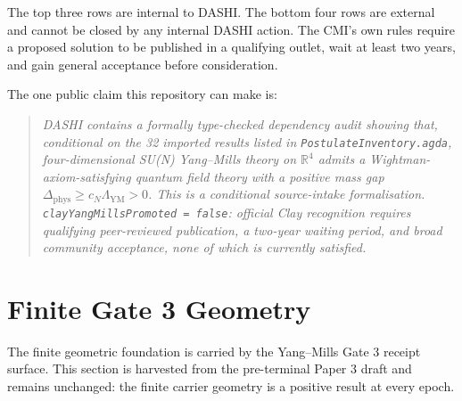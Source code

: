\documentclass[11pt,a4paper]{article}
\begin{document}
The top three rows are internal to DASHI.  The bottom four rows are external
and cannot be closed by any internal DASHI action.  The CMI's own rules
\cite{clayrules} require a proposed solution to be published in a qualifying
outlet, wait at least two years, and gain general acceptance before
consideration.

The one public claim this repository can make is:

\begin{quote}
\emph{DASHI contains a formally type-checked dependency audit showing that,
conditional on the 32 imported results listed in
\texttt{PostulateInventory.agda}, four-dimensional SU(N) Yang--Mills theory on
$\mathbb{R}^4$ admits a Wightman-axiom-satisfying quantum field theory with a
positive mass gap $\Delta_{\mathrm{phys}} \geq c_N \Lambda_{\mathrm{YM}} > 0$.
This is a conditional source-intake formalisation.
\texttt{clayYangMillsPromoted = false}: official Clay recognition requires
qualifying peer-reviewed publication, a two-year waiting period, and broad
community acceptance, none of which is currently satisfied.}
\end{quote}

\section{Finite Gate 3 Geometry}

The finite geometric foundation is carried by the Yang--Mills Gate 3 receipt
surface.  This section is harvested from the pre-terminal Paper 3 draft and
remains unchanged: the finite carrier geometry is a positive result at every
epoch.
\end{document}
